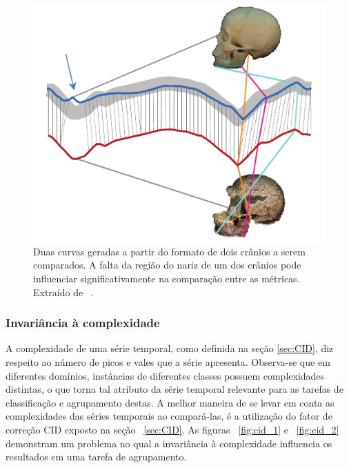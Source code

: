 \begin{figure}[h!]
	\includegraphics[width=\linewidth]{figuras/invariancias/oclusao.png}
	\caption{Duas curvas geradas a partir do formato de dois crânios a serem comparados. A falta da região do nariz de um dos crânios pode influenciar significativamente na comparação entre as métricas. Extraído de ~\parencite{CID}.}
	\label{fig:inv_oclusao}
\end{figure}

\subsubsection{Invariância à complexidade}

A complexidade de uma série temporal, como definida na seção \ref{sec:CID}, diz respeito ao número de picos e vales que a série apresenta. Observa-se que em diferentes domínios, instâncias de diferentes classes possuem complexidades distintas, o que torna tal atributo da série temporal relevante para as tarefas de classificação e agrupamento destas. A melhor maneira de se levar em conta as complexidades das séries temporais ao compará-las, é a utilização do fator de correção CID exposto na seção ~\ref{sec:CID}. As figuras ~\ref{fig:cid_1} e ~\ref{fig:cid_2} demonstram um problema no qual a invariância à complexidade influencia os resultados em uma tarefa de agrupamento.

